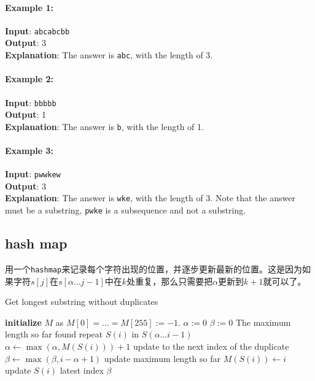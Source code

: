 \documentclass[a4paper,12pt]{article}
\begin{document}
\paragraph{Example 1:}
\begin{flushleft}
\textbf{Input}: \texttt{abcabcbb}
\\
\textbf{Output}: 3 
\\
\textbf{Explanation}: The answer is \texttt{abc}, with the length of 3. 
\end{flushleft}
\paragraph{Example 2:}
\begin{flushleft}
\textbf{Input}: \texttt{bbbbb}
\\
\textbf{Output}: 1
\\
\textbf{Explanation}: The answer is \texttt{b}, with the length of 1.
\end{flushleft}
\paragraph{Example 3:}
\begin{flushleft}
\textbf{Input}: \texttt{pwwkew}
\\
\textbf{Output}: 3
\\
\textbf{Explanation}: The answer is \texttt{wke}, with the length of 3. Note that the answer must be a substring, \texttt{pwke} is a subsequence and not a substring.
\end{flushleft}
\subsection{hash map}
\begin{CJK*}{UTF8}{gbsn}
用一个\texttt{hashmap}来记录每个字符出现的位置，并逐步更新最新的位置。这是因为如果字符$s[j]$在$s[\alpha\ldots j-1]$中在$k$处重复，那么只需要把$\alpha$更新到$k+1$就可以了。
\clearpage
\end{CJK*}
\begin{algorithm}[H]
\caption{Get longest substring without duplicates}
\begin{algorithmic}[1]
\Statex
{}
\State \textbf{initialize} $M$ as $M[0]=\ldots=M[255]:=-1$.
\State $\alpha := 0 $
\State $\beta := 0$ \Comment The maximum length so far
 \Comment found repeat $S(i)$ in $S(\alpha\ldots i-1)$
\State $\alpha \gets \max(\alpha, M(S(i))) + 1$ \Comment update to the next index of the duplicate
\EndIf
\State $\beta \gets \max(\beta, i - \alpha +1 )$ \Comment update maximum length so far
\State $M(S(i)) \gets i$ \Comment update $S(i)$ latest index
\EndFor
\State \Return $\beta$
\EndProcedure
\Statex
\end{algorithmic}
\end{algorithm}
\end{document}
